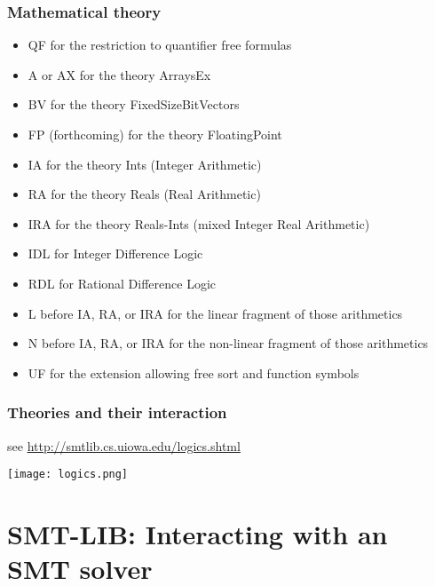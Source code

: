 \documentclass{beamer}
\begin{document}
\begin{frame}[fragile]\frametitle{Mathematical theory}

  \begin{itemize}
  \item QF for the restriction to quantifier free formulas
  \item  A or AX for the theory ArraysEx
  \item     BV for the theory FixedSizeBitVectors
  \item     FP (forthcoming) for the theory FloatingPoint
  \item     IA for the theory Ints (Integer Arithmetic)
  \item     RA for the theory Reals (Real Arithmetic)
  \item     IRA for the theory Reals-Ints (mixed Integer Real Arithmetic)
  \item     IDL for Integer Difference Logic
  \item     RDL for Rational Difference Logic
  \item     L before IA, RA, or IRA for the linear fragment of those
    arithmetics
  \item     N before IA, RA, or IRA for the non-linear fragment of those
    arithmetics
  \item     UF for the extension allowing free sort and function symbols
  \end{itemize}
  
\end{frame}

\begin{frame}[fragile]\frametitle{Theories and their interaction}
  see \url{http://smtlib.cs.uiowa.edu/logics.shtml}

  \begin{center}
  \texttt{[image: logics.png]}
\end{center}

\end{frame}




\section{SMT-LIB: Interacting with an SMT solver}
\end{document}
